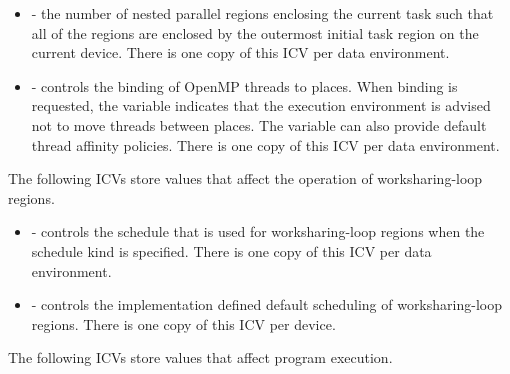 \begin{itemize}
\item {} - the number of nested parallel regions enclosing the current task such that
all of the  regions are enclosed by the outermost initial task region on the
current device. There is one copy of this ICV per data environment.

\item {} - controls the binding of OpenMP threads to places. When binding is
requested, the variable indicates that the execution environment is advised not to
move threads between places. The variable can also provide default thread affinity
policies. There is one copy of this ICV per data environment.
\end{itemize}

The following ICVs store values that affect the operation of worksharing-loop regions.

\begin{itemize}
\item {} - controls the schedule that is used for
worksharing-loop regions when the  schedule kind is
specified. There is one copy of this ICV per data environment.

\item {} - controls the implementation defined default
  scheduling of worksharing-loop regions. There is one copy of this ICV per device.
\end{itemize}

The following ICVs store values that affect program execution.

